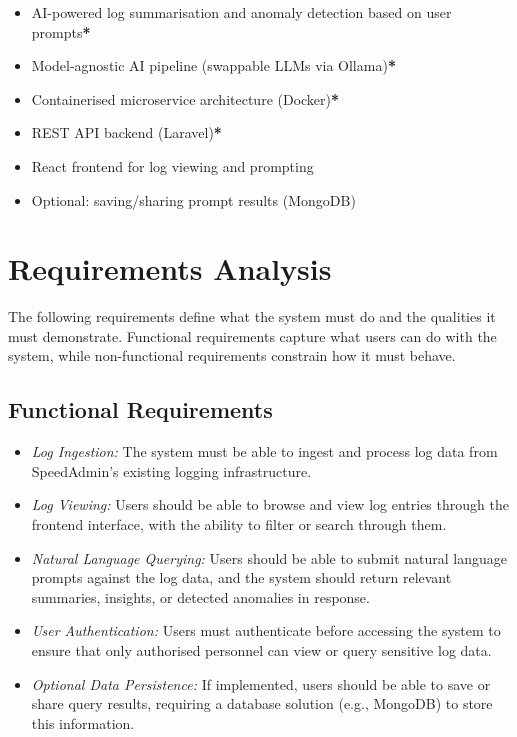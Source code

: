 \documentclass[12pt, a4paper]{article}
\begin{document}
\begin{itemize}
    \item AI-powered log summarisation and anomaly detection based on user prompts{\color{red}\textbf{*}}
    \item Model-agnostic AI pipeline (swappable LLMs via Ollama){\color{red}\textbf{*}}
    \item Containerised microservice architecture (Docker){\color{red}\textbf{*}}
    \item REST API backend (Laravel){\color{red}\textbf{*}}
    \item React frontend for log viewing and prompting
    \item Optional: saving/sharing prompt results (MongoDB)
\end{itemize}

\section{Requirements Analysis}

The following requirements define what the system must do and the qualities it must demonstrate. Functional requirements capture what users can do with the system, while non-functional requirements constrain how it must behave.

\subsection{Functional Requirements} %
\begin{itemize}
    \item \textit{Log Ingestion:} The system must be able to ingest and process log data from SpeedAdmin's existing logging infrastructure.
    \item \textit{Log Viewing:} Users should be able to browse and view log entries through the frontend interface, with the ability to filter or search through them.
    \item \textit{Natural Language Querying:} Users should be able to submit natural language prompts against the log data, and the system should return relevant summaries, insights, or detected anomalies in response.
    \item \textit{User Authentication:} Users must authenticate before accessing the system to ensure that only authorised personnel can view or query sensitive log data.
    \item \textit{Optional Data Persistence:} If implemented, users should be able to save or share query results, requiring a database solution (e.g., MongoDB) to store this information.
\end{itemize}
\end{document}
